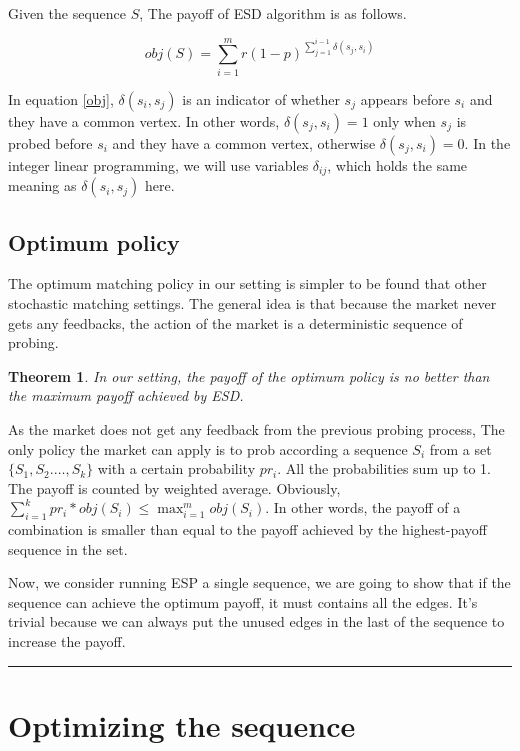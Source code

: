 \documentclass[letterpaper]{article}
\newtheorem{theorem}{Theorem}%
\newenvironment{proof}{{Proof:}}{\hfill\rule{2mm}{2mm}}
\begin{document}
Given the sequence $S$, The payoff of ESD algorithm is as follows.

\begin{equation}\label{obj}
obj(S)=\sum_{i=1}^m r(1-p)^{\sum_{j=1}^{i-1}\delta(s_j,s_i)}
\end{equation}

In equation \ref{obj}, $\delta(s_i,s_j)$ is an indicator of whether $s_j$ appears before $s_i$ and they have a common vertex. In other words, $\delta(s_j,s_i)=1$ only when $s_j$ is probed before $s_i$ and they have a common vertex, otherwise  $\delta(s_j,s_i)=0$. 
In the integer linear programming, we will use variables $\delta_{ij}$, which holds the same meaning as $\delta(s_i,s_j)$ here.

\subsection{Optimum policy}

The optimum matching policy in our setting is simpler to be found that other stochastic matching settings.
The general idea is that because the market never gets any feedbacks, the action of the market is a deterministic sequence of probing.
\begin{theorem}
	In our setting, the payoff of the optimum policy is no better than the maximum payoff achieved by ESD.
\end{theorem}
\begin{proof}
	As the market does not get any feedback from the previous probing process,
	The only policy the market can apply is to prob according a sequence $S_i$ from a set $\{S_1,S_2.\ldots,S_k\}$ with a certain probability $pr_i$.
	All the probabilities sum up to 1.
	The payoff is counted by weighted average.
	Obviously, $\sum_{i=1}^{k}pr_i*obj(S_i)\leq \max_{i=1}^{m}obj(S_i)$.
	In other words, the payoff of a combination is smaller than equal to the payoff achieved by the highest-payoff sequence in the set.
	
	Now, we consider running ESP a single sequence, we are going to show that if the sequence can achieve the optimum payoff, it must contains all the edges. It's trivial because we can always put the unused edges in the last of the sequence to increase the payoff. 
\end{proof}

\section{Optimizing the sequence}
\end{document}
